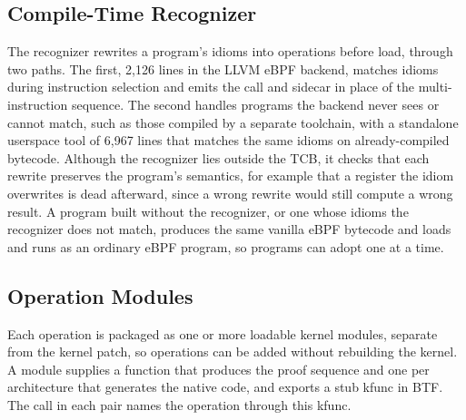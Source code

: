 \subsection{Compile-Time Recognizer}
\label{subsec:llvm}

The recognizer rewrites a program's idioms into \lang operations before load, through two paths.
The first, 2{,}126 lines in the LLVM eBPF backend, matches idioms during instruction selection and emits the call and sidecar in place of the multi-instruction sequence.
The second handles programs the backend never sees or cannot match, such as those compiled by a separate toolchain, with a standalone userspace tool of 6{,}967 lines that matches the same idioms on already-compiled bytecode.
Although the recognizer lies outside the TCB, it checks that each rewrite preserves the program's semantics, for example that a register the idiom overwrites is dead afterward, since a wrong rewrite would still compute a wrong result.
A program built without the recognizer, or one whose idioms the recognizer does not match, produces the same vanilla eBPF bytecode and loads and runs as an ordinary eBPF program, so programs can adopt \tool one at a time.

\subsection{Operation Modules}
\label{subsec:descriptors}

Each \lang operation is packaged as one or more loadable kernel modules, separate from the kernel patch, so operations can be added without rebuilding the kernel.
A module supplies a function that produces the proof sequence and one per architecture that generates the native code, and exports a stub kfunc in BTF. The call in each pair names the operation through this kfunc.

